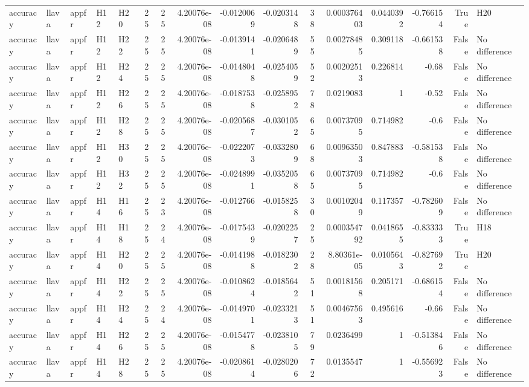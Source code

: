 \begin{longtable}{lllllrrrrrrrrrrl}
accuracy & llava & appfr & H12 & H20 & 25 & 25 & 4.20076e-08 & -0.0120069 & -0.0203148 & 38 & 0.000376403 & 0.0440392 & -0.766154 & True & H20 \\
accuracy & llava & appfr & H12 & H22 & 25 & 25 & 4.20076e-08 & -0.0139141 & -0.0206489 & 55 & 0.00278485 & 0.309118 & -0.661538 & False & No difference \\
accuracy & llava & appfr & H12 & H24 & 25 & 25 & 4.20076e-08 & -0.0148048 & -0.0254059 & 52 & 0.00202513 & 0.226814 & -0.68 & False & No difference \\
accuracy & llava & appfr & H12 & H26 & 25 & 25 & 4.20076e-08 & -0.0187538 & -0.0258952 & 78 & 0.0219083 & 1 & -0.52 & False & No difference \\
accuracy & llava & appfr & H12 & H28 & 25 & 25 & 4.20076e-08 & -0.0205687 & -0.0301052 & 65 & 0.00737095 & 0.714982 & -0.6 & False & No difference \\
accuracy & llava & appfr & H12 & H30 & 25 & 25 & 4.20076e-08 & -0.0222073 & -0.0332809 & 68 & 0.00963503 & 0.847883 & -0.581538 & False & No difference \\
accuracy & llava & appfr & H12 & H32 & 25 & 25 & 4.20076e-08 & -0.0248991 & -0.0352058 & 65 & 0.00737095 & 0.714982 & -0.6 & False & No difference \\
accuracy & llava & appfr & H14 & H16 & 25 & 23 & 4.20076e-08 & -0.012766 & -0.0158258 & 30 & 0.00102049 & 0.117357 & -0.782609 & False & No difference \\
accuracy & llava & appfr & H14 & H18 & 25 & 24 & 4.20076e-08 & -0.0175439 & -0.0202257 & 25 & 0.000354792 & 0.0418655 & -0.833333 & True & H18 \\
accuracy & llava & appfr & H14 & H20 & 25 & 25 & 4.20076e-08 & -0.0141988 & -0.0182302 & 28 & 8.80361e-05 & 0.0105643 & -0.827692 & True & H20 \\
accuracy & llava & appfr & H14 & H22 & 25 & 25 & 4.20076e-08 & -0.0108624 & -0.0185642 & 51 & 0.00181568 & 0.205171 & -0.686154 & False & No difference \\
accuracy & llava & appfr & H14 & H24 & 25 & 24 & 4.20076e-08 & -0.0149701 & -0.0233213 & 51 & 0.00467563 & 0.495616 & -0.66 & False & No difference \\
accuracy & llava & appfr & H14 & H26 & 25 & 25 & 4.20076e-08 & -0.0154778 & -0.0238105 & 79 & 0.0236499 & 1 & -0.513846 & False & No difference \\
accuracy & llava & appfr & H14 & H28 & 25 & 25 & 4.20076e-08 & -0.0208614 & -0.0280206 & 72 & 0.0135547 & 1 & -0.556923 & False & No difference \\

\end{longtable}
